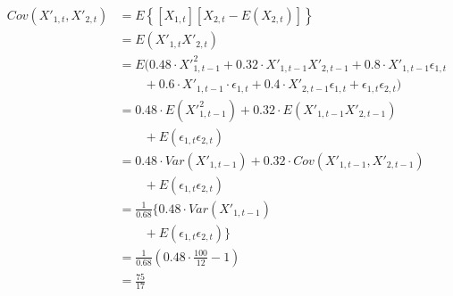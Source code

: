 \begin{solution}
\begin{equation}
\begin{aligned}
Cov(X'_{1,t},X'_{2,t}) 	& = E\left\{[X_{1,t}][X_{2,t} - E(X_{2,t})]\right\} \\
											& = E(X'_{1,t}X'_{2,t}) \\
											& = E(0.48 \cdot {X'}_{1,t-1}^2 + 0.32 \cdot X'_{1,t-1} X'_{2,t-1} + 0.8 \cdot X'_{1,t-1} \epsilon_{1,t} \\
											& \qquad	 + 0.6 \cdot X'_{1,t-1} \cdot \epsilon_{1,t} + 0.4 \cdot X'_{2,t-1} \epsilon_{1,t}
															+ \epsilon_{1,t} \epsilon_{2,t} )\\
											& = 0.48 \cdot E({X'}_{1,t-1}^2) + 0.32 \cdot E(X'_{1,t-1} X'_{2,t-1}) \\
											& \qquad + E(\epsilon_{1,t} \epsilon_{2,t}) \\
											& = 0.48 \cdot Var(X'_{1,t-1}) + 0.32 \cdot Cov(X'_{1,t-1}, X'_{2,t-1}) \\
											& \qquad + E(\epsilon_{1,t} \epsilon_{2,t}) \\
											& = \frac{1}{0.68} \{0.48 \cdot Var(X'_{1,t-1}) \\
											& \qquad + E(\epsilon_{1,t} \epsilon_{2,t})\} \\
											& = \frac{1}{0.68} \left( 0.48 \cdot \frac{100}{12} - 1 \right) \\
											& = \frac{75}{17}
\end{aligned}
\end{equation}


\end{solution}
